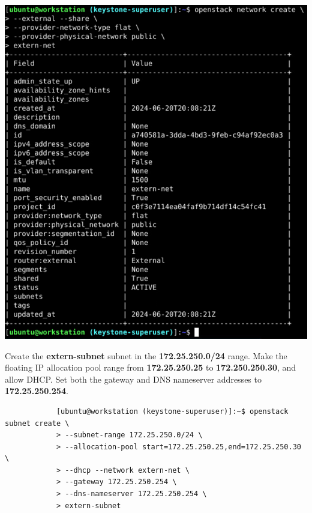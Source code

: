 \documentclass[letterpaper, 12pt]{article}
\begin{document}
\begin{enumerate}
\begin{labstep}
        \begin{center}
            \includegraphics[width=\linewidth]{images/part1/step21.png}
        \end{center}
    \end{labstep}

    \begin{labstep}
        Create the \textbf{extern-subnet} subnet in the \textbf{172.25.250.0/24} range.
        Make the floating IP allocation pool range from \textbf{172.25.250.25} to \textbf{172.250.250.30}, and allow DHCP.
        Set both the gateway and DNS nameserver addresses to \textbf{172.25.250.254}.
        \begin{lstlisting}
            [ubuntu@workstation (keystone-superuser)]:~$ openstack subnet create \
            > --subnet-range 172.25.250.0/24 \
            > --allocation-pool start=172.25.250.25,end=172.25.250.30 \
            > --dhcp --network extern-net \
            > --gateway 172.25.250.254 \
            > --dns-nameserver 172.25.250.254 \
            > extern-subnet
        \end{lstlisting}


\end{labstep}
\end{enumerate}
\end{document}
